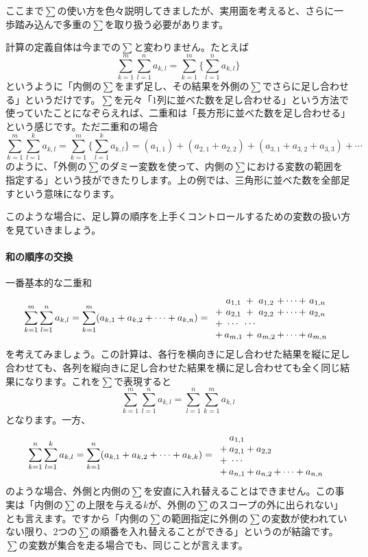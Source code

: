 ここまで$\sum$の使い方を色々説明してきましたが、実用面を考えると、さらに一歩踏み込んで多重の$\sum$を取り扱う必要があります。

計算の定義自体は今までの$\sum$と変わりません。たとえば
\[
\sum_{k = 1}^m \sum_{l  = 1}^n a_{k,l} = \sum_{k = 1}^m \Biggl\{\sum_{l  = 1}^n a_{k,l}\Biggr\}
\]
というように「内側の$\sum$をまず足し、その結果を外側の$\sum$でさらに足し合わせる」というだけです。$\sum$を元々「$1$列に並べた数を足し合わせる」という方法で使っていたことになぞらえれば、二重和は「長方形に並べた数を足し合わせる」という感じです。ただ二重和の場合
\[
\sum_{k = 1}^m \sum_{l  = 1}^k a_{k,l} = \sum_{k = 1}^m \Biggl\{\sum_{l  = 1}^k a_{k, l}\Biggr\} = (a_{1, 1}) + (a_{2, 1} + a_{2, 2}) + (a_{3, 1} + a_{3, 2} + a_{3, 3}) + \cdots
\]
のように、「外側の$\sum$のダミー変数を使って、内側の$\sum$における変数の範囲を指定する」という技ができたりします。上の例では、三角形に並べた数を全部足すという意味になります。

このような場合に、足し算の順序を上手くコントロールするための変数の扱い方を見ていきましょう。

\paragraph{和の順序の交換} 一番基本的な二重和
\begin{align*}
\sum_{k = 1}^m \sum_{l  = 1}^n a_{k, l} 
= \sum_{k = 1}^m (a_{k, 1} + a_{k, 2} + \cdots + a_{k, n} )
=
\begin{array}{c@{\,}c@{\,}c@{\,}c@{\,}c@{\,}c}
 &a_{1, 1}  &+ &a_{1, 2} &+ \cdots + &a_{1, n} \\
+ &a_{2, 1} &+ &a_{2, 2} &+ \cdots + &a_{2, n} \\
+ & \cdots &\cdots \\
+ &a_{m, 1} &+ &a_{m, 2} &+ \cdots + &a_{m, n}
\end{array}
\end{align*}
を考えてみましょう。この計算は、各行を横向きに足し合わせた結果を縦に足し合わせても、各列を縦向きに足し合わせた結果を横に足し合わせても全く同じ結果になります。これを$\sum$で表現すると
\[
\sum_{k = 1}^m \sum_{l  = 1}^n a_{k, l} =
\sum_{l  = 1}^n \sum_{k = 1}^m a_{k, l} 
\]
となります。一方、
\begin{align*}
\sum_{k = 1}^n \sum_{l  = 1}^k a_{k,l}
= \sum_{k = 1}^n (a_{k, 1} + a_{k, 2} + \cdots + a_{k, k})
=
\begin{array}{c@{\,}c@{\,}c@{\,}c@{\,}c}
 &a_{1, 1} \\
+ &a_{2, 1} &+& a_{2, 2} \\
+ &\cdots \\
+ &a_{n, 1} &+& a_{n, 2} &+ \cdots + a_{n, n}
\end{array}
\end{align*}
のような場合、外側と内側の$\sum$を安直に入れ替えることはできません。この事実は「内側の$\sum$の上限を与える$k$が、外側の$\sum$のスコープの外に出られない」とも言えます。ですから「内側の$\sum$の範囲指定に外側の$\sum$の変数が使われていない限り、$2$つの$\sum$の順番を入れ替えることができる」というのが結論です。$\sum$の変数が集合を走る場合でも、同じことが言えます。

